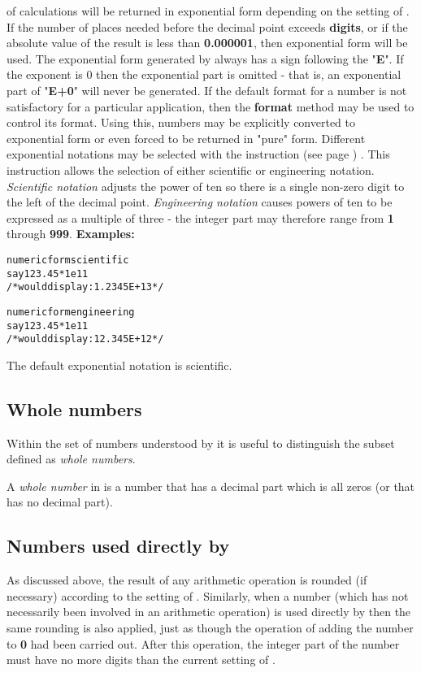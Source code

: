 of calculations will be returned in exponential form depending on the
setting of .
If the number of places needed before the decimal point
exceeds \textbf{digits}, or if the absolute value of the result is
less than \textbf{0.000001}, then exponential form will be used.
The exponential form generated by \nr{} always has a sign following the
"\textbf{E}".
If the exponent is 0 then the exponential part is omitted - that
is, an exponential part of "\textbf{E+0}" will never be
generated.
 If the default format for a number is not satisfactory for a
particular application, then the \textbf{format} method may be used to
control its format.  Using this, numbers may be explicitly converted to
exponential form or even forced to be returned in "pure" form.
\label{refnfo2}
 Different exponential notations may be selected with the
  instruction (see page \pageref{refnform}) .
This instruction allows the selection of either scientific or
engineering notation.
\emph{Scientific notation} adjusts the power of ten so there is a
single non-zero digit to the left of the decimal point.
\emph{Engineering notation} causes powers of ten to be expressed as a
multiple of three - the integer part may therefore range
from \textbf{1} through \textbf{999}.
 \textbf{Examples:}
\begin{alltt}
numeric form scientific
say 123.45 * 1e11
/* would display: 1.2345E+13 */

numeric form engineering
say 123.45  * 1e11
/* would display: 12.345E+12 */
\end{alltt}
 The default exponential notation is scientific.
\subsection{Whole numbers}\label{refwholed}
 Within the set of numbers understood by \nr{} it is useful to
distinguish the subset defined as \emph{whole numbers}.
 
A \emph{whole number} in \nr{} is a number that has a decimal part
which is all zeros (or that has no decimal part).
\subsection{Numbers used directly by \nr{}}\label{refnumuse}
 As discussed above, the result of any arithmetic operation is
rounded (if necessary) according to the setting of .
Similarly, when a number (which has not necessarily been involved in an
arithmetic operation) is used directly by \nr{} then the same rounding
is also applied, just as though the operation of adding the number
to \textbf{0} had been carried out.
After this operation, the integer part of the number must have no more
digits than the current setting of .
 
